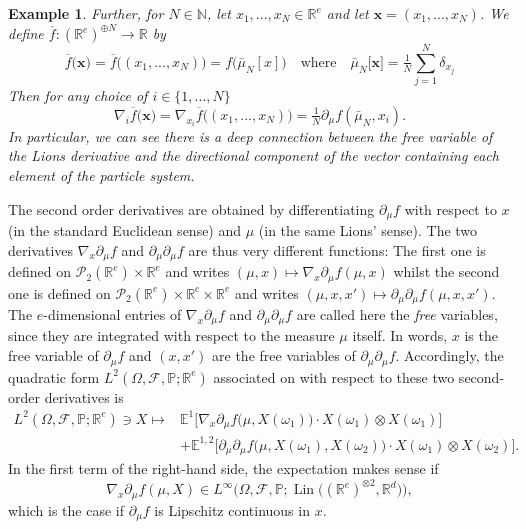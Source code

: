 \documentclass[a4paper,11pt,twoside]{article}
\numberwithin{equation}{section}
\theoremstyle{plain}
\newtheorem{example}[theorem]{Example}
\newcommand{\bE}{\mathbb{E}}
\newcommand{\bN}{\mathbb{N}}
\newcommand{\bP}{\mathbb{P}}
\newcommand{\bR}{\mathbb{R}}
\newcommand{\cF}{\mathcal{F}}
\newcommand{\cP}{\mathcal{P}}
\DeclareMathOperator{\lin}{Lin}
\newcommand{\1}{\mathbbm{1}}
\begin{document}
\begin{example}
		Further, for $N\in \bN$, let $x_1, ..., x_N \in  \bR^e$ and let $\boldsymbol{x} = (x_1, ..., x_N)$. We define $\overline{f}: (\bR^e)^{\oplus N} \to \bR$ by
		\begin{equation}
			\label{eq:Empirical-Dist}
			\overline{f}\big( \boldsymbol{x} \big) = \overline{f}\Big( (x_1, ..., x_N) \Big) = f\Big( \bar{\mu}_N[x] \Big) 
			\quad \mbox{where}\quad
			\bar{\mu}_N\big[ \boldsymbol{x} \big] = \tfrac{1}{N} \sum_{j=1}^N \delta_{x_j}
		\end{equation}
		Then for any choice of $i\in \{1, ..., N\}$
		\begin{equation}
			\label{eq:Empirical-1Deriv}
			\nabla_i \overline{f}\big( \boldsymbol{x} \big) = \nabla_{x_i} \overline{f}\big( (x_1, ..., x_N) \big) = \tfrac{1}{N} \partial_\mu f(\bar{\mu}_N, x_i). 
		\end{equation}
		In particular, we can see there is a deep connection between the free variable of the Lions derivative and the directional component of the vector containing each element of the particle system. 
	\end{example}
	
	The second order derivatives are obtained by differentiating $\partial_{\mu} f$ with respect to $x$ (in the standard Euclidean sense) and $\mu$ (in the same Lions' sense). The two derivatives $\nabla_{x} \partial_{\mu} f$ and $\partial_{\mu} \partial_{\mu} f$ are thus very different functions: The first one is defined on ${\cP}_{2}({\bR}^e) \times {\bR}^e$ and writes $(\mu,x) \mapsto \nabla_{x} \partial_{\mu} f(\mu,x)$ whilst the second one is defined on ${\cP}_{2}({\bR}^e) \times {\bR}^e \times {\bR}^e$ and writes $(\mu,x,x') \mapsto \partial_{\mu} \partial_{\mu} f(\mu,x,x')$. The $e$-dimensional entries of $\nabla_{x} \partial_{\mu} f$ and $\partial_{\mu} \partial_{\mu} f$ are called here the \textit{free} variables, since they are integrated with respect to the measure $\mu$ itself. In words, $x$ is the free variable of $\partial_{\mu} f$ and $(x,x')$ are the free variables of $\partial_{\mu} \partial_{\mu} f$. Accordingly, the quadratic form $L^2(\Omega,\cF,\bP; \bR^e)$ associated on with respect to these two second-order derivatives is
	\begin{align*}
		L^2(\Omega,\cF,\bP; \bR^e) \ni X \mapsto &\bE^1 \Big[ \nabla_{x} \partial_{\mu} f \big( \mu, X(\omega_1) \big) \cdot X(\omega_1) \otimes X(\omega_1) \Big] 
		\\
		&+ \bE^{1,2} \Big[ \partial_{\mu} \partial_{\mu}f \big( \mu, X(\omega_1), X(\omega_2) \big) \cdot X(\omega_1) \otimes X(\omega_2) \Big]. 
	\end{align*}
	In the first term of the right-hand side, the expectation makes sense if 
	$$
	\nabla_{x} \partial_{\mu}f(\mu,X) \in L^\infty\Big( \Omega,\cF,\bP; \lin\big( (\bR^e)^{\otimes 2}, \bR^d\big) \Big),
	$$
	which is the case if $\partial_{\mu} f$ is Lipschitz continuous in $x$.
	
\end{document}
